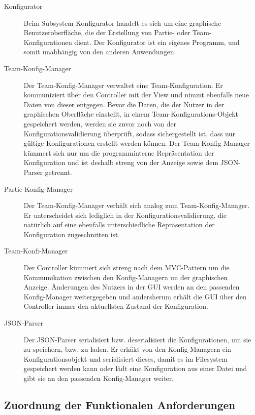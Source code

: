 \begin{description}

\item[Konfigurator]

Beim Subsystem Konfigurator handelt es sich um eine graphische Benutzeroberfläche, die der Erstellung von Partie- oder Team-Konfigurationen dient. Der Konfigurator ist ein eigenes Programm, und somit unabhängig von den anderen Anwendungen.

\item[Team-Konfig-Manager]
Der Team-Konfig-Manager verwaltet eine Team-Konfiguration. Er kommuniziert über den Controller mit der View und nimmt ebenfalls neue Daten von dieser entgegen. Bevor die Daten, die der Nutzer in der graphischen Oberfläche einstellt, in einem Team-Konfigurations-Objekt gespeichert werden, werden sie zuvor noch von der Konfigurationsvalidierung überprüft, sodass sichergestellt ist, dass nur gültige Konfigurationen erstellt werden können. Der Team-Konfig-Manager kümmert sich nur um die programminterne Repräsentation der Konfiguration und ist deshalb streng von der Anzeige sowie dem JSON-Parser getrennt.

\item[Partie-Konfig-Manager]
Der Team-Konfig-Manager verhält sich analog zum Team-Konfig-Manager. Er unterscheidet sich lediglich in der Konfigurationsvalidierung, die natürlich auf eine ebenfalls unterschiedliche Repräsentation der Konfiguration zugeschnitten ist.

\item[Team-Konfi-Manager]
Der Controller kümmert sich streng nach dem MVC-Pattern um die Kommunikation zwischen den Konfig-Managern un der graphischen Anzeige. Änderungen des Nutzers in der GUI werden an den passenden Konfig-Manager weitergegeben und andersherum erhält die GUI über den Controller immer den aktuellsten Zustand der Konfiguration.
\item[JSON-Parser]
Der JSON-Parser serialisiert bzw. deserialisiert die Konfigurationen, um sie zu speichern, bzw. zu laden. Er erhäkt von den Konfig-Managern ein Konfigurationsobjekt und serialisiert dieses, damit es im Filesystem gespeichert werden kann oder lädt eine Konfiguration aus einer Datei und gibt sie an den passenden Konfig-Manager weiter.
\end{description}

\subsection{Zuordnung der Funktionalen Anforderungen}

